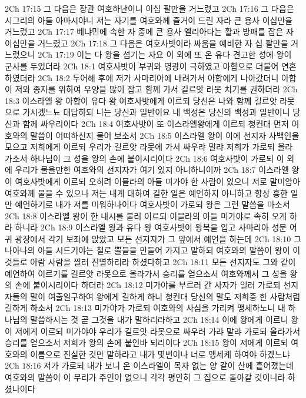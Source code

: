 2Ch 17:15  그 다음은 장관 여호하난이니 이십 팔만을 거느렸고
2Ch 17:16  그 다음은 시그리의 아들 아마시야니 저는 자기를 여호와께 즐거이 드린 자라 큰 용사 이십만을 거느렸고
2Ch 17:17  베냐민에 속한 자 중에 큰 용사 엘리아다는 활과 방패를 잡은 자 이십만을 거느렸고
2Ch 17:18  그 다음은 여호사밧이라 싸움을 예비한 자 십 팔만을 거느렸으니
2Ch 17:19  이는 다 왕을 섬기는 자요 이 외에 또 온 유다 견고한 성에 왕이 군사를 두었더라
2Ch 18:1  여호사밧이 부귀와 영광이 극하였고 아합으로 더불어 연혼하였더라
2Ch 18:2  두어해 후에 저가 사마리아에 내려가서 아합에게 나아갔더니 아합이 저와 종자를 위하여 우양을 많이 잡고 함께 가서 길르앗 라못 치기를 권하더라
2Ch 18:3  이스라엘 왕 아합이 유다 왕 여호사밧에게 이르되 당신은 나와 함께 길르앗 라못으로 가시겠느뇨 대답하되 나는 당신과 일반이요 내 백성은 당신의 백성과 일반이니 당신과 함께 싸우리이다
2Ch 18:4  여호사밧이 또 이스라엘왕에게 이르되 청컨대 먼저 여호와의 말씀이 어떠하신지 물어 보소서
2Ch 18:5  이스라엘 왕이 이에 선지자 사백인을 모으고 저희에게 이르되 우리가 길르앗 라못에 가서 싸우랴 말랴 저희가 가로되 올라 가소서 하나님이 그 성을 왕의 손에 붙이시리이다
2Ch 18:6  여호사밧이 가로되 이 외에 우리가 물을만한 여호와의 선지자가 여기 있지 아니하니이까
2Ch 18:7  이스라엘 왕이 여호사밧에게 이르되 오히려 이믈라의 아들 미가야 한 사람이 있으니 저로 말미암아 여호와께 물을 수 있으나 저는 내게 대하여 길한 일은 예언하지 아니하고 항상 흉한 일만 예언하기로 내가 저를 미워하나이다 여호사밧이 가로되 왕은 그런 말씀을 마소서
2Ch 18:8  이스라엘 왕이 한 내시를 불러 이르되 이믈라의 아들 미가야로 속히 오게 하라 하니라
2Ch 18:9  이스라엘 왕과 유다 왕 여호사밧이 왕복을 입고 사마리아 성문 어귀 광장에서 각기 보좌에 앉았고 모든 선지자가 그 앞에서 예언을 하는데
2Ch 18:10  그나아나의 아들 시드기야는 철로 뿔들을 만들어 가지고 말하되 여호와의 말씀이 왕이 이것들로 아람 사람을 찔러 진멸하리라 하셨다하고
2Ch 18:11  모든 선지자도 그와 같이 예언하여 이르기를 길르앗 라못으로 올라가서 승리를 얻으소서 여호와께서 그 성을 왕의 손에 붙이시리이다 하더라
2Ch 18:12  미가야를 부르러 간 사자가 일러 가로되 선지자들의 말이 여출일구하여 왕에게 길하게 하니 청컨대 당신의 말도 저희중 한 사람처럼 길하게 하소서
2Ch 18:13  미가야가 가로되 여호와의 사심을 가리켜 맹세하노니 내 하나님의 말씀하시는 것 곧 그것을 내가 말하리라하고
2Ch 18:14  이에 왕에게 이르니 왕이 저에게 이르되 미가야야 우리가 길르앗 라못으로 싸우러 가랴 말랴 가로되 올라가서 승리를 얻으소서 저희가 왕의 손에 붙인바 되리이다
2Ch 18:15  왕이 저에게 이르되 여호와의 이름으로 진실한 것만 말하라고 내가 몇번이나 너로 맹세케 하여야 하겠느냐
2Ch 18:16  저가 가로되 내가 보니 온 이스라엘이 목자 없는 양 같이 산에 흩어졌는데 여호와의 말씀이 이 무리가 주인이 없으니 각각 평안히 그 집으로 돌아갈 것이니라 하셨나이다
